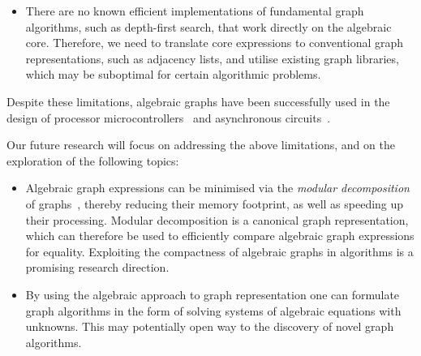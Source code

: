 \begin{itemize}
    \vspace{0.5mm}
    \item There are no known efficient implementations of fundamental graph
    algorithms, such as depth-first search, that work directly on the algebraic
    core. Therefore, we need to translate core expressions to conventional
    graph representations, such as adjacency lists, and utilise existing graph
    libraries, which may be suboptimal for certain algorithmic problems.
\end{itemize}

Despite these limitations, algebraic graphs have been successfully used
in the design of processor microcontrollers~\cite{2014_algebra_mokhov} and
asynchronous circuits~\cite{2015_beaumont_concepts}.

Our future research will focus on addressing the above limitations, and on the
exploration of the following topics:

\begin{itemize}
    \item Algebraic graph expressions can be minimised via the
    \emph{modular decomposition} of graphs~\cite{2005_mcconnell_modular}, thereby
    reducing their memory footprint, as well as speeding up their processing.
    Modular decomposition is a canonical graph representation, which can therefore
    be used to efficiently compare algebraic graph expressions for equality.
    Exploiting the compactness of algebraic graphs in algorithms is a
    promising research direction.
    \item By using the algebraic approach to graph representation one can
    formulate graph algorithms in the form of solving systems of algebraic
    equations with unknowns.
    This may potentially open way to the discovery of novel graph algorithms.
\end{itemize}
